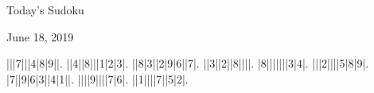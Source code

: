 \documentclass{article}
\begin{document}
\begin{center}
\Huge{Today's Sudoku}
\end{center}
\begin{center}
\Large{June 18, 2019}
\end{center}
\begin{sudoku}
|||7|||4|8|9||.
||4||8|||1|2|3|.
||8|3||2|9|6||7|.
||3||2||8||||.
|8|||||||3|4|.
|||2||||5|8|9|.
|7||9|6|3||4|1||.
||||9||||7|6|.
||1||||7||5|2|.
\end{sudoku}
\end{document}

